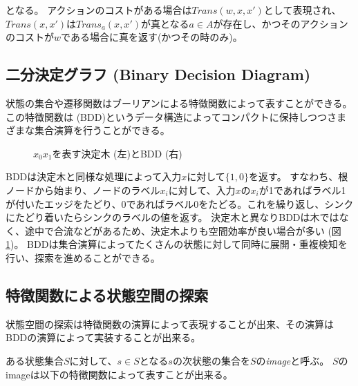 となる。
アクションのコストがある場合は$Trans(w, x, x')$として表現され、$Trans(x,x')$は$Trans_a(x,x')$が真となる$a \in A$が存在し、かつそのアクションのコストが$w$である場合に真を返す(かつその時のみ)。


\subsection{二分決定グラフ (Binary Decision Diagram)}
\label{sec:binary-decision-diagram}

状態の集合や遷移関数はブーリアンによる特徴関数によって表すことができる。
この特徴関数は (BDD)というデータ構造によってコンパクトに保持しつつさまざまな集合演算を行うことができる。


\begin{figure}
  \centering
  \begin{tikzpicture}[scale=0.6]
    
  \end{tikzpicture}
  \caption{$x_0 x_1$を表す決定木 (左)とBDD (右)}
  \label{fig:bdd}
\end{figure}

BDDは決定木と同様な処理によって入力$x$に対して$\{1, 0\}$を返す。
すなわち、根ノードから始まり、ノードのラベル$x_i$に対して、入力$x$の$x_i$が1であればラベル1が付いたエッジをたどり、0であればラベル0をたどる。これを繰り返し、シンクにたどり着いたらシンクのラベルの値を返す。
決定木と異なりBDDは木ではなく、途中で合流などがあるため、決定木よりも空間効率が良い場合が多い (図\ref{fig:bdd})。
BDDは集合演算によってたくさんの状態に対して同時に展開・重複検知を行い、探索を進めることができる。



\subsection{特徴関数による状態空間の探索}

状態空間の探索は特徴関数の演算によって表現することが出来、その演算はBDDの演算によって実装することが出来る。

ある状態集合$S$に対して、$s \in S$となる$s$の次状態の集合を$S$の{\it image}と呼ぶ。
$S$のimageは以下の特徴関数によって表すことが出来る。

